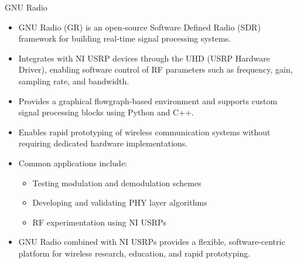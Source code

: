 \begin{frame}{GNU Radio}
\footnotesize

\begin{itemize}
    \item GNU Radio (GR) is an open-source Software Defined Radio (SDR) framework for building real-time signal processing systems.
    
    \item Integrates with NI USRP devices through the UHD (USRP Hardware Driver), enabling software control of RF parameters such as frequency, gain, sampling rate, and bandwidth.
    
    \item Provides a graphical flowgraph-based environment and supports custom signal processing blocks using Python and C++.
    
    \item Enables rapid prototyping of wireless communication systems without requiring dedicated hardware implementations.
    
    \item Common applications include:
    \begin{itemize}
        \item Testing modulation and demodulation schemes
        \item Developing and validating PHY layer algorithms
        \item RF experimentation using NI USRPs
    \end{itemize}
    
    \item GNU Radio combined with NI USRPs provides a flexible, software-centric platform for wireless research, education, and rapid prototyping.
\end{itemize}

\end{frame}